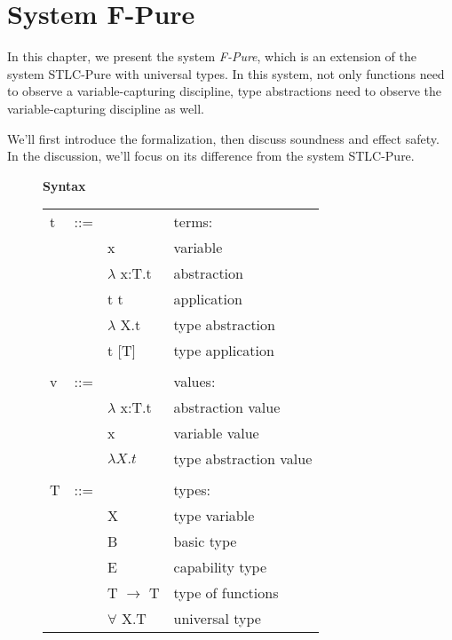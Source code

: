 \section{System F-Pure}

In this chapter, we present the system \emph{F-Pure}, which is an
extension of the system STLC-Pure with universal types. In this
system, not only functions need to observe a variable-capturing
discipline, type abstractions need to observe the variable-capturing
discipline as well.

We'll first introduce the formalization, then discuss soundness and
effect safety. In the discussion, we'll focus on its difference from
the system STLC-Pure.

\begin{figure}
\begin{framed}

\setlength{\columnseprule}{0.4pt}
\begin{multicols}{2}

\textbf{Syntax}

\begin{tabu} to \linewidth {l l l X[r]}
  t   & ::= &                                      & terms:               \\
      &     &  x                                   & variable             \\
      &     & $\lambda$ x:T.t                      & abstraction          \\
      &     & t t                                  & application          \\
      &     & \colorbox{shade}{$\lambda$ X.t}      & type abstraction     \\
      &     & \colorbox{shade}{t [T]}              & type application     \\
\\
  v   & ::= &                    & values:              \\
      &     & $\lambda$ x:T.t    & abstraction value    \\
      &     & x                  & variable value       \\
      &     & \colorbox{shade}{$\lambda X.t$}    & type abstraction value  \\
\\
  T   & ::= &                       & types:               \\
      &     & \colorbox{shade}{X}   & type variable        \\
      &     & B                     & basic type           \\
      &     & E                     & capability type      \\
      &     & T $\to$ T             & type of functions    \\
      &     & \colorbox{shade}{$\forall$ X.T} & universal type       \\
\end{tabu}


\end{multicols}
\end{framed}
\end{figure}
